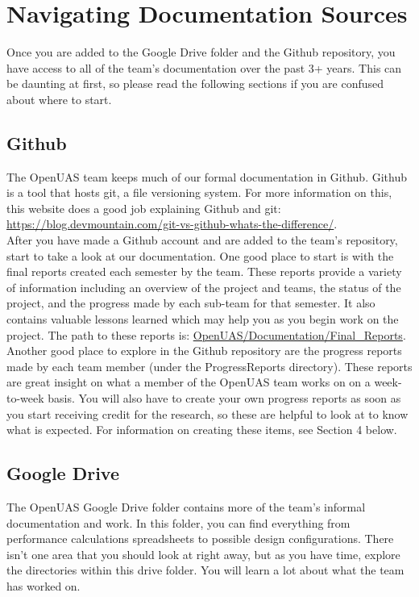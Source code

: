 \documentclass{article}
\begin{document}
\section{Navigating Documentation Sources}
Once you are added to the Google Drive folder and the Github repository, you have access to all of the team's documentation over the past 3+ years. This can be daunting at first, so please read the following sections if you are confused about where to start. 

\subsection{Github}
The OpenUAS team keeps much of our formal documentation in Github. Github is a tool that hosts git, a file versioning system. For more information on this, this website does a good job explaining Github and git: \url{https://blog.devmountain.com/git-vs-github-whats-the-difference/}. \\

\noindent After you have made a Github account and are added to the team's repository, start to take a look at our documentation. One good place to start is with the final reports created each semester by the team. These reports provide a variety of information including an overview of the project and teams, the status of the project, and the progress made by each sub-team for that semester. It also contains valuable lessons learned which may help you as you begin work on the project. The path to these reports is: \url{OpenUAS/Documentation/Final_Reports}.\\

\noindent Another good place to explore in the Github repository are the progress reports made by each team member (under the ProgressReports directory). These reports are great insight on what a member of the OpenUAS team works on on a week-to-week basis. You will also have to create your own progress reports as soon as you start receiving credit for the research, so these are helpful to look at to know what is expected. For information on creating these items, see Section 4 below. 

\subsection{Google Drive}
The OpenUAS Google Drive folder contains more of the team's informal documentation and work. In this folder, you can find everything from performance calculations spreadsheets to possible design configurations. There isn't one area that you should look at right away, but as you have time, explore the directories within this drive folder. You will learn a lot about what the team has worked on. 
\end{document}
